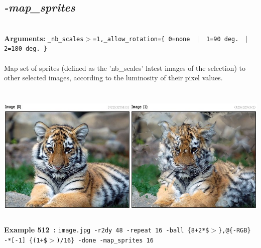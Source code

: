\documentclass[a4paper,11pt,twoside]{book}
\begin{document}
\subsection{\emph{-map\_sprites} }\vspace*{-0.5em}
~\\\textbf{Arguments: } 
{\small \texttt{\_nb\_scales$>$=1,\_allow\_rotation=\{ 0=none ~$|$~ 1=90 deg. ~$|$~ 2=180 deg. \}}}\\~\\
Map set of sprites (defined as the 'nb\_scales' latest images of the selection) to other selected images,
according to the luminosity of their pixel values.
\begin{center}\includegraphics[keepaspectratio=true,height=7cm,width=\textwidth]{img/gmic_def512.jpg}\\
{\footnotesize \textbf{Example 512~:} \texttt{image.jpg -r2dy 48 -repeat 16 -ball \{8+2*\$$>$\},@\{-RGB\} -*[-1] \{(1+\$$>$)/16\} -done -map\_sprites 16}}
\end{center}
\end{document}
